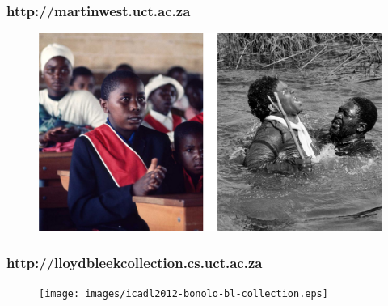 \documentclass[xcolor=dvitex,t,11pt]{beamer}
\begin{document}
\begin{frame}[fragile]
\frametitle{http://martinwest.uct.ac.za}
\begin{figure}
\centering
\includegraphics[width=\linewidth, height=\textwidth, keepaspectratio]{images/icadl2012-bonolo-martinwest-collection.eps}
\end{figure}
\end{frame}

\begin{frame}[fragile]
\frametitle{http://lloydbleekcollection.cs.uct.ac.za}
\begin{figure}
\centering
\texttt{[image: images/icadl2012-bonolo-bl-collection.eps]}
\end{figure}
\end{frame}
\end{document}
